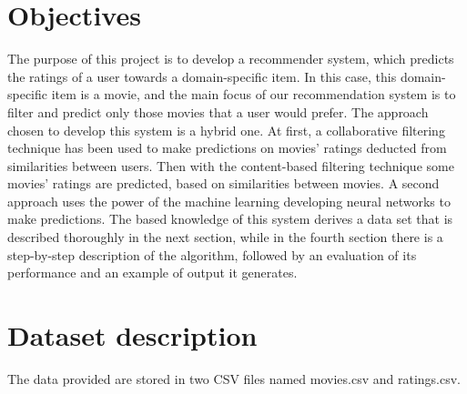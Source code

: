 \documentclass{article}
\begin{document}
\newpage

\section{Objectives}

The purpose of this project is to develop a recommender system, which predicts the ratings of a user towards a domain-specific item. In this case, this domain-specific item is a movie, and the main focus of our recommendation system is to filter and predict only those movies that a user would prefer. The approach chosen to develop this system is a hybrid one. At first, a collaborative filtering technique has been used to make predictions on movies' ratings deducted from similarities between users. Then with the content-based filtering technique some movies' ratings are predicted, based on similarities between movies. A second approach uses the power of the machine learning developing neural networks to make predictions. The based knowledge of this system derives a data set that is described thoroughly in the next section, while in the fourth section there is a step-by-step description of the algorithm, followed by an evaluation of its performance and an example of output it generates.

\section{Dataset description}
The data provided are stored in two CSV files named movies.csv and ratings.csv.
\end{document}
